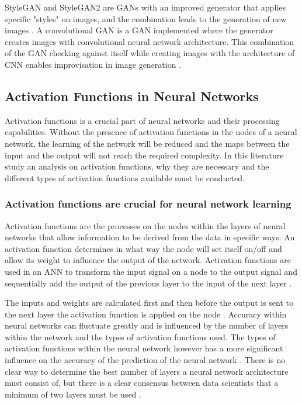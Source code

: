 StyleGAN and StyleGAN2 are GANs with an improved generator that applies specific "styles" on images, and the combination leads to the generation of new images \citep{Karras2019,Karras2020}. A convolutional GAN is a GAN implemented where the generator creates images with convolutional neural network architecture. This combination of the GAN checking against itself while creating images with the architecture of CNN enables improvisation in image generation \citep{Karras2019,Wang}.

\subsection{Activation Functions in Neural Networks}

Activation functions is a crucial part of neural networks and their processing capabilities. Without the presence of activation functions in the nodes of a neural network, the learning of the network will be reduced and the maps between the input and the output will not reach the required complexity. In this literature study an analysis on activation functions, why they are necessary and the different types of activation functions available must be conducted.

\subsubsection{Activation functions are crucial for neural network learning}

Activation functions are the processes on the nodes within the layers of neural networks that allow information to be derived from the data in specific ways. An activation function determines in what way the node will set itself on/off and allow its weight to influence the output of the network. Activation functions are used in an ANN to transform the input signal on a node to the output signal and sequentially add the output of the previous layer to the input of the next layer \cite{sharma2017}.

The inputs and weights are calculated first and then before the output is sent to the next layer the activation function is applied on the node \citep{sharma2017}. Accuracy within neural networks can fluctuate greatly and is influenced by the number of layers within the network and the types of activation functions used. The types of activation functions within the neural network however has a more significant influence on the accuracy of the prediction of the neural network \cite{sharma2017}. There is no clear way to determine the best number of layers a neural network architecture must consist of, but there is a clear consensus between data scientists that a minimum of two layers must be used \cite{sharma2017}.

